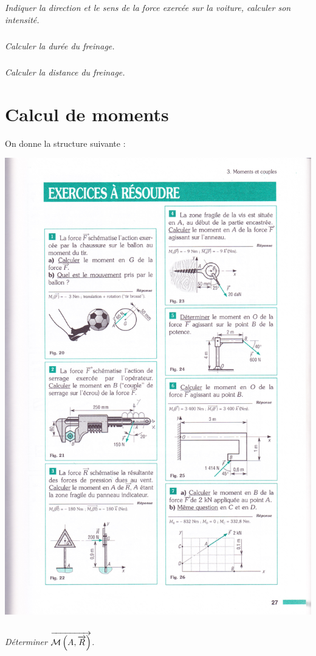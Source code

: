 \documentclass[10pt,fleqn]{article} %
\begin{document}
\begin{multicols}{2}
\subparagraph{}
\textit{Indiquer la direction et le sens de la force exercée sur la voiture, calculer son intensité.}

\subparagraph{}
\textit{Calculer la durée du freinage.}

\subparagraph{}
\textit{Calculer la distance du freinage.}


\section*{ Calcul de moments}
\setcounter{exo}{0}
\setcounter{subparagraph}{0}
On donne la structure suivante : 
\begin{center}
\includegraphics[width=.6\linewidth]{images/moment8}
\end{center}

\subparagraph{}
\textit{Déterminer $\overrightarrow{\mathcal{M}\left(A,\overrightarrow{R} \right)}$.}


\end{multicols}
\end{document}
